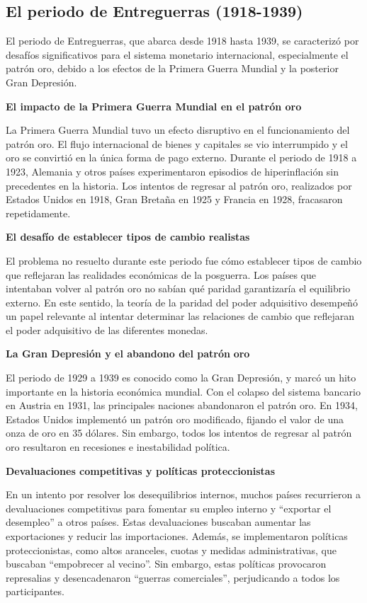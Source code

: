 \documentclass[
  jou,
  floatsintext,
  longtable,
  a4paper,
  nolmodern,
  notxfonts,
  notimes,
  12pt,
  colorlinks=true,linkcolor=blue,citecolor=blue,urlcolor=blue]{apa7}
\begin{document}
\subsection{El periodo de Entreguerras
(1918-1939)}\label{el-periodo-de-entreguerras-1918-1939}

El periodo de Entreguerras, que abarca desde 1918 hasta 1939, se
caracterizó por desafíos significativos para el sistema monetario
internacional, especialmente el patrón oro, debido a los efectos de la
Primera Guerra Mundial y la posterior Gran Depresión.

\textbf{El impacto de la Primera Guerra Mundial en el patrón oro}

La Primera Guerra Mundial tuvo un efecto disruptivo en el funcionamiento
del patrón oro. El flujo internacional de bienes y capitales se vio
interrumpido y el oro se convirtió en la única forma de pago externo.
Durante el periodo de 1918 a 1923, Alemania y otros países
experimentaron episodios de hiperinflación sin precedentes en la
historia. Los intentos de regresar al patrón oro, realizados por Estados
Unidos en 1918, Gran Bretaña en 1925 y Francia en 1928, fracasaron
repetidamente.

\textbf{El desafío de establecer tipos de cambio realistas}

El problema no resuelto durante este periodo fue cómo establecer tipos
de cambio que reflejaran las realidades económicas de la posguerra. Los
países que intentaban volver al patrón oro no sabían qué paridad
garantizaría el equilibrio externo. En este sentido, la teoría de la
paridad del poder adquisitivo desempeñó un papel relevante al intentar
determinar las relaciones de cambio que reflejaran el poder adquisitivo
de las diferentes monedas.

\textbf{La Gran Depresión y el abandono del patrón} \textbf{oro}

El periodo de 1929 a 1939 es conocido como la Gran Depresión, y marcó un
hito importante en la historia económica mundial. Con el colapso del
sistema bancario en Austria en 1931, las principales naciones
abandonaron el patrón oro. En 1934, Estados Unidos implementó un patrón
oro modificado, fijando el valor de una onza de oro en 35 dólares. Sin
embargo, todos los intentos de regresar al patrón oro resultaron en
recesiones e inestabilidad política.

\textbf{Devaluaciones competitivas y políticas proteccionistas}

En un intento por resolver los desequilibrios internos, muchos países
recurrieron a devaluaciones competitivas para fomentar su empleo interno
y ``exportar el desempleo'' a otros países. Estas devaluaciones buscaban
aumentar las exportaciones y reducir las importaciones. Además, se
implementaron políticas proteccionistas, como altos aranceles, cuotas y
medidas administrativas, que buscaban ``empobrecer al vecino''. Sin
embargo, estas políticas provocaron represalias y desencadenaron
``guerras comerciales'', perjudicando a todos los participantes.
\end{document}
